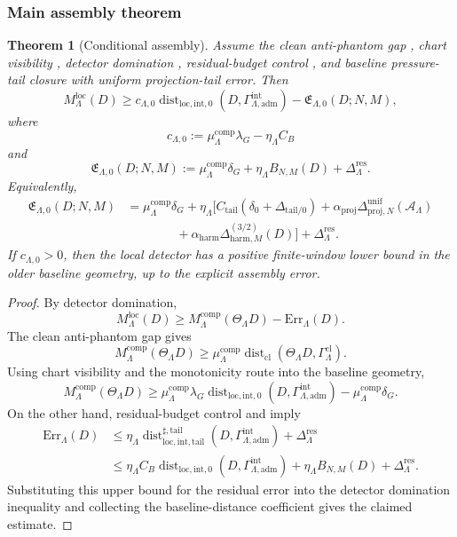 \documentclass[11pt]{article}
\numberwithin{equation}{section}
\newtheorem{theorem}{Theorem}[section]
\theoremstyle{definition}
\theoremstyle{remark}
\newcommand{\loc}{\mathrm{loc}}
\newcommand{\intg}{\mathrm{int}}
\newcommand{\tail}{\mathrm{tail}}
\newcommand{\adm}{\mathrm{adm}}
\newcommand{\proj}{\mathrm{proj}}
\newcommand{\harm}{\mathrm{harm}}
\newcommand{\cl}{\mathrm{cl}}
\newcommand{\Dist}{\operatorname{dist}}
\newcommand{\Gammaadm}{\Gamma^{\intg}_{\Lambda,\adm}}
\begin{document}
\subsubsection{Main assembly theorem}

\begin{theorem}[Conditional assembly]
\label{thm:conditional-baseline-assembly}
Assume the clean anti-phantom gap
, chart visibility
, detector domination
, residual-budget control
, and baseline pressure-tail closure with
uniform projection-tail error.  Then
\[
    M^{\loc}_\Lambda(D)
    \ge
    c_{\Lambda,0}
    \Dist_{\loc,\intg,0}(D,\Gammaadm)
    -
    \mathfrak E_{\Lambda,0}(D;N,M),
\]
where
\[
    c_{\Lambda,0}
    :=
    \mu^{\mathrm{comp}}_\Lambda\lambda_G
    -
    \eta_\Lambda C_B
\]
and
\[
    \mathfrak E_{\Lambda,0}(D;N,M)
    :=
    \mu^{\mathrm{comp}}_\Lambda\delta_G
    +
    \eta_\Lambda B_{N,M}(D)
    +
    \Delta_\Lambda^{\mathrm{res}}.
\]
Equivalently,
\[
\begin{aligned}
    \mathfrak E_{\Lambda,0}(D;N,M)
    &=
    \mu^{\mathrm{comp}}_\Lambda\delta_G
    +
    \eta_\Lambda
    \bigl[
        C_{\tail}(\delta_0+\Delta_{\tail/0})
        +
        \alpha_{\proj}
        \Delta^{\mathrm{unif}}_{\proj,N}(\mathcal A_\Lambda)
\\
    &\qquad\qquad
        +
        \alpha_{\harm}
        \Delta_{\harm,M}^{(3/2)}(D)
    \bigr]
    +
    \Delta_\Lambda^{\mathrm{res}}.
\end{aligned}
\]
If \(c_{\Lambda,0}>0\), then the local detector has a positive finite-window
lower bound in the older baseline geometry, up to the explicit assembly
error.
\end{theorem}

\begin{proof}
By detector domination,
\[
    M^{\loc}_\Lambda(D)
    \ge
    M^{\mathrm{comp}}_\Lambda(\Theta_\Lambda D)
    -
    \mathrm{Err}_\Lambda(D).
\]
The clean anti-phantom gap gives
\[
    M^{\mathrm{comp}}_\Lambda(\Theta_\Lambda D)
    \ge
    \mu^{\mathrm{comp}}_\Lambda
    \operatorname{dist}_{\cl}
    (\Theta_\Lambda D,\Gamma^{\cl}_\Lambda).
\]
Using chart visibility and the monotonicity route into the baseline geometry,
\[
    M^{\mathrm{comp}}_\Lambda(\Theta_\Lambda D)
    \ge
    \mu^{\mathrm{comp}}_\Lambda\lambda_G
    \Dist_{\loc,\intg,0}(D,\Gammaadm)
    -
    \mu^{\mathrm{comp}}_\Lambda\delta_G.
\]
On the other hand, residual-budget control and
 imply
\[
\begin{aligned}
    \mathrm{Err}_\Lambda(D)
    &\le
    \eta_\Lambda
    \Dist^{\sharp,\tail}_{\loc,\intg,\tail}(D,\Gammaadm)
    +
    \Delta_\Lambda^{\mathrm{res}}
\\
    &\le
    \eta_\Lambda C_B
    \Dist_{\loc,\intg,0}(D,\Gammaadm)
    +
    \eta_\Lambda B_{N,M}(D)
    +
    \Delta_\Lambda^{\mathrm{res}}.
\end{aligned}
\]
Substituting this upper bound for the residual error into the detector
domination inequality and collecting the baseline-distance coefficient gives
the claimed estimate.
\end{proof}
\end{document}
